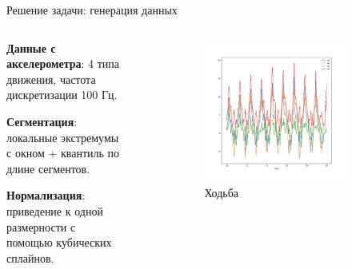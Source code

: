 \documentclass{beamer}
\begin{document}
    \begin{frame}{Решение задачи: генерация данных}
    \begin{columns} %
        \begin{column}{.4\textwidth}
            \textbf{Данные с акселерометра}: 4 типа движения, частота дискретизации
            100 Гц.

            \textbf{Сегментация}: локальные экстремумы с окном + квантиль по длине
            сегментов.

            \textbf{Нормализация}: приведение к одной размерности с помощью
            кубических сплайнов.

        \end{column}%
        \hfill
        \begin{column}{.6\textwidth}
            \begin{figure}
                \begin{subfigure}[b]{0.4\textwidth}
                    \centering
                    \includegraphics[width=\linewidth]{../pics/raw_walking.png}
                    \caption{Ходьба}
                \end{subfigure}
                \begin{subfigure}[b]{0.4\textwidth}
                    \centering

\end{subfigure}
\end{figure}
\end{column}
\end{columns}
\end{frame}
\end{document}
